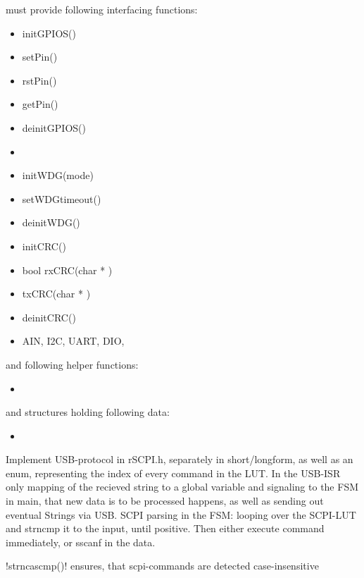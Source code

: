 	{	must provide following interfacing functions:
		\begin{itemize} \setlength\itemsep{1px}
		\item initGPIOS()
		\item setPin()
		\item rstPin()
		\item getPin()
		\item deinitGPIOS()

		\item 
		\item initWDG(mode)
		\item setWDGtimeout()
		\item deinitWDG()

		\item initCRC()
		\item bool rxCRC(char * )
		\item txCRC(char * )
		\item deinitCRC()

		\item AIN, I2C, UART, DIO,
		\end{itemize}
		and following helper functions:
		\begin{itemize} \setlength\itemsep{1px}
		\item 
		\end{itemize}

		and structures holding following data:
		\begin{itemize} \setlength\itemsep{1px}
		\item 
		\end{itemize}

	}


		{Implement USB-protocol in rSCPI.h, separately in short/longform, as well as an enum, representing the index of every command in the LUT.
		In the USB-ISR only mapping of the recieved string to a global variable and signaling to the FSM in main, that new data is to be processed happens, as well as sending out eventual Strings via USB.
		SCPI parsing in the FSM: looping over the SCPI-LUT and strncmp it to the input, until positive. Then either execute command immediately, or sscanf in the data. }

	{	\lstC !strncascmp()! ensures, that scpi-commands are detected case-insensitive
	}


